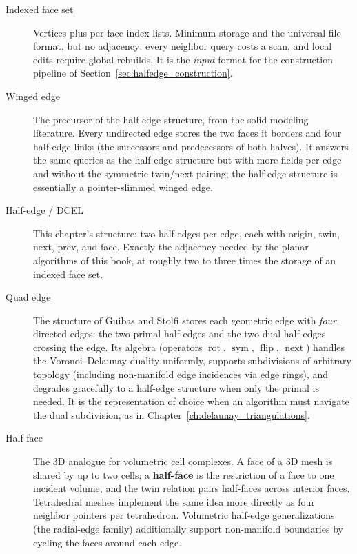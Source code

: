 \begin{description}
  \item[Indexed face set] Vertices plus per-face index lists. Minimum
    storage and the universal file format, but no adjacency: every
    neighbor query costs a scan, and local edits require global rebuilds.
    It is the \emph{input} format for the construction pipeline of
    Section~\ref{sec:halfedge_construction}.
  \item[Winged edge] The precursor of the half-edge
    structure, from the solid-modeling literature. Every undirected edge
    stores the two faces it borders and four half-edge links (the
    successors and predecessors of both halves). It answers the same
    queries as the half-edge structure but with more fields per edge and
    without the symmetric twin/next pairing; the half-edge structure is
    essentially a pointer-slimmed winged edge.
  \item[Half-edge / DCEL] This chapter's structure: two
    half-edges per edge, each with origin, twin, next, prev, and face.
    Exactly the adjacency needed by the planar algorithms of this book, at
    roughly two to three times the storage of an indexed face set.
  \item[Quad edge] The structure of Guibas and Stolfi
    \cite{guibas1985} stores each geometric edge with \emph{four} directed
    edges: the two primal half-edges and the two dual half-edges crossing
    the edge. Its algebra (operators $\operatorname{rot}$,
    $\operatorname{sym}$, $\operatorname{flip}$, $\operatorname{next}$)
    handles the Voronoi--Delaunay duality uniformly, supports subdivisions
    of arbitrary topology (including non-manifold edge incidences via
    edge rings), and degrades gracefully to a half-edge structure when
    only the primal is needed. It is the representation of choice when an
    algorithm must navigate the dual subdivision, as in
    Chapter~\ref{ch:delaunay_triangulations}.
  \item[Half-face] The 3D analogue for volumetric cell
    complexes. A face of a 3D mesh is shared by up to two cells; a
    \textbf{half-face} is the restriction of a face to one incident
    volume, and the twin relation pairs half-faces across interior faces.
    Tetrahedral meshes implement the same idea more directly as four
    neighbor pointers per tetrahedron. Volumetric half-edge
    generalizations (the radial-edge family) additionally support
    non-manifold boundaries by cycling the faces around each edge.
\end{description}

